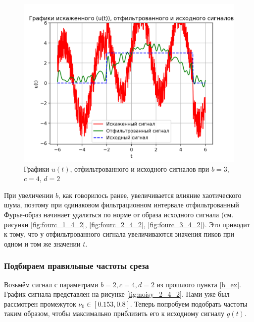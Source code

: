 \clearpage

\begin{figure}[ht!]
    \centering
    \includegraphics[scale=0.85]{media/1 task/specific_freq/Cleaned_3_4_2_-0,8:-0,153.png}
    \caption{Графики  $u(t)$, отфильтрованного и исходного сигналов при $b=3$,  $c=4$,  $d=2$}
    \label{fig:cleaned_3_4_2}
\end{figure}

При увеличении $b$, как говорилось ранее, увеличивается влияние хаотического шума, поэтому при одинаковом фильтрационном интервале отфильтрованный Фурье-образ начинает удаляться по норме от образа исходного сигнала (см. рисунки \ref{fig:fourc_1_4_2}, \ref{fig:fourc_2_4_2}, \ref{fig:fourc_3_4_2}). Это приводит к тому, что у отфильтрованного сигнала увеличиваются значения пиков при одном и том же значении $t$.

\subsubsection{Подбираем правильные частоты среза }

Возьмём сигнал с параметрами $b=2, c=4, d=2$ из прошлого пункта \ref{b_ex}. График сигнала представлен на рисунке \ref{fig:noisy_2_4_2}. Нами уже был рассмотрен промежуток $\nu_0 \in [0.153, 0.8]$. Теперь попробуем подобрать частоты таким образом, чтобы максимально приблизить его к исходному сигналу $g(t)$.

\clearpage


